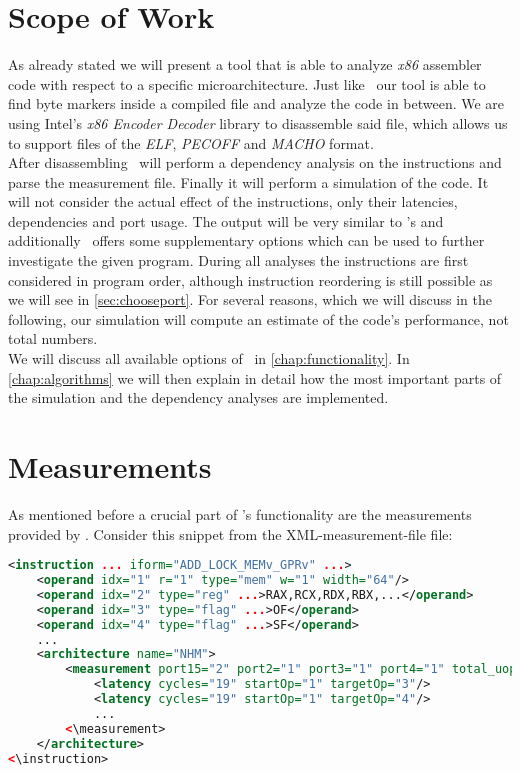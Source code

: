  
\section{Scope of Work}

As already stated we will present a tool that is able to analyze \emph{x86} assembler code with respect to a specific microarchitecture. Just like \iaca\ our tool is able to find byte markers inside a compiled file and analyze the code in between.  We are using Intel's \emph{x86 Encoder Decoder} library \cite{xed} to disassemble said file, which allows us to support files of the \emph{ELF}, \emph{PECOFF} and \emph{MACHO} format.\\

After disassembling \suaca\ will perform a dependency analysis on the instructions and parse the measurement file. Finally it will perform a simulation of the code. It will not consider the actual effect of the instructions, only their latencies, dependencies and port usage. The output will be very similar to \iaca's and additionally \suaca\ offers some supplementary options which can be used to further investigate the given program. During all analyses the instructions are first considered in program order, although instruction reordering is still possible as we will see in \autoref{sec:chooseport}. For several reasons, which we will discuss in the following, our simulation will compute an estimate of the code's performance, not total numbers.\\
We will discuss all available options of \suaca\ in \autoref{chap:functionality}. In \autoref{chap:algorithms} we will then explain in detail how the most important parts of the simulation and the dependency analyses are implemented.



\section{Measurements}
\label{sec:measurements}

As mentioned before a crucial part of \suaca's functionality are the measurements provided by \cite{Andreas}. Consider this snippet from the XML-measurement-file file:

\begin{lstlisting}[language=XML, basicstyle=\ttfamily\scriptsize, breaklines=false]
<instruction ... iform="ADD_LOCK_MEMv_GPRv" ...>
    <operand idx="1" r="1" type="mem" w="1" width="64"/>
    <operand idx="2" type="reg" ...>RAX,RCX,RDX,RBX,...</operand>
    <operand idx="3" type="flag" ...>OF</operand>
    <operand idx="4" type="flag" ...>SF</operand>
    ...
    <architecture name="NHM">
        <measurement port15="2" port2="1" port3="1" port4="1" total_uops="5">
            <latency cycles="19" startOp="1" targetOp="3"/>
            <latency cycles="19" startOp="1" targetOp="4"/>
            ...
        <\measurement>
    </architecture>
<\instruction>
\end{lstlisting}

